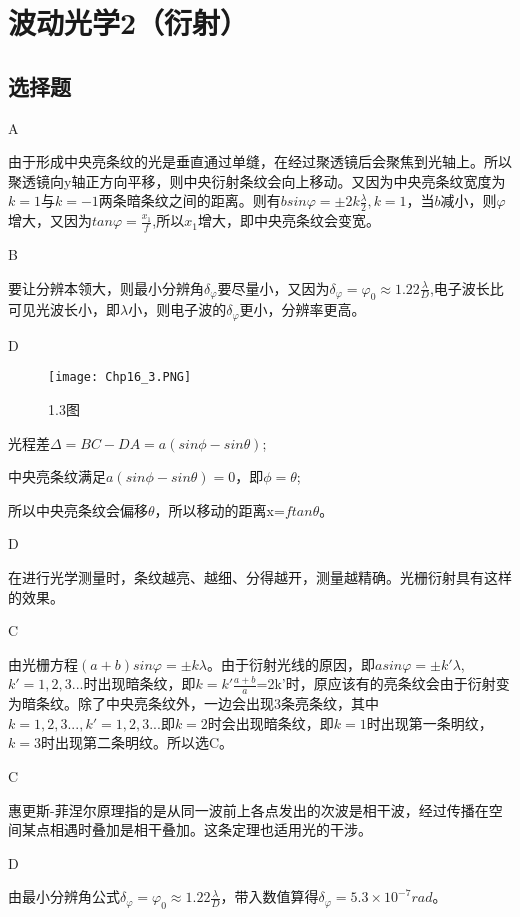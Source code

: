 \chapter{波动光学2（衍射）}
\section{选择题}
\exercise A

\solve
由于形成中央亮条纹的光是垂直通过单缝，在经过聚透镜后会聚焦到光轴上。所以聚透镜向y轴正方向平移，则中央衍射条纹会向上移动。又因为中央亮条纹宽度为$k=1$与$k=-1$两条暗条纹之间的距离。则有$bsin\varphi=\pm2k\frac{\lambda}{2},k=1$，当$b$减小，则$\varphi$增大，又因为$tan\varphi=\frac{x_1}{f}$,所以$x_1$增大，即中央亮条纹会变宽。

\exercise B

\solve
要让分辨本领大，则最小分辨角$\delta_\varphi$要尽量小，又因为$\delta_\varphi=\varphi_0\approx1.22\frac{\lambda}{D}$,电子波长比可见光波长小，即$\lambda$小，则电子波的$\delta_\varphi$更小，分辨率更高。

\exercise D

\solve
\begin{figure}[htbp]
\centering
\texttt{[image: Chp16\_3.PNG]}
\caption{1.3图}
\end{figure}
光程差$\Delta=BC-DA=a(sin\phi-sin\theta)$;

中央亮条纹满足$a(sin\phi-sin\theta)=0$，即$\phi=\theta$;

所以中央亮条纹会偏移$\theta$，所以移动的距离x=$ftan\theta$。

\exercise D

\solve
在进行光学测量时，条纹越亮、越细、分得越开，测量越精确。光栅衍射具有这样的效果。

\exercise C

\solve
由光栅方程$(a+b)sin\varphi=\pm k\lambda$。由于衍射光线的原因，即$asin\varphi=\pm k'\lambda$,$k'=1,2,3...$时出现暗条纹，即$k=k'\frac{a+b}{a}$=2k'时，原应该有的亮条纹会由于衍射变为暗条纹。除了中央亮条纹外，一边会出现3条亮条纹，其中$k=1,2,3...,k'=1,2,3...$即$k=2$时会出现暗条纹，即$k=1$时出现第一条明纹，$k=3$时出现第二条明纹。所以选C。

\exercise C

\solve
惠更斯-菲涅尔原理指的是从同一波前上各点发出的次波是相干波，经过传播在空间某点相遇时叠加是相干叠加。这条定理也适用光的干涉。

\exercise D

\solve
由最小分辨角公式$\delta_\varphi=\varphi_0\approx1.22\frac{\lambda}{D}$，带入数值算得$\delta_\varphi=5.3\times10^{-7}rad$。


